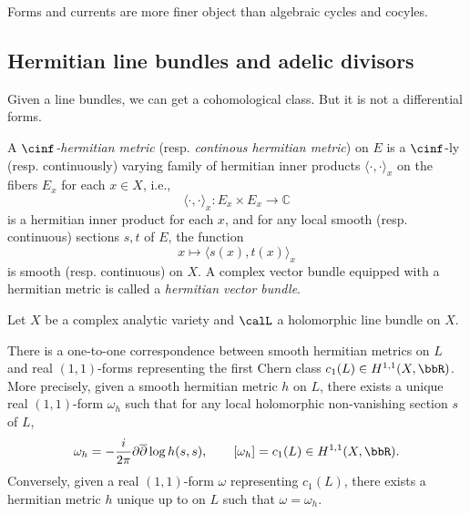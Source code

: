 Forms and currents are more finer object than algebraic cycles and cocyles.

\Yang{}







\subsection[status=draft,tag=0000000,label=\labelNFM{subsec:review-of-metrics}]{Hermitian line bundles and adelic divisors}


Given a line bundles, we can get a cohomological class.
But it is not a differential forms.

\begin{definition}[label=\labelNFM{def:hermitian-line-bundles}, status=draft, tag=0000000]
	A \emph{$\cinf$-hermitian metric} (resp. \emph{continous hermitian metric}) on \(E\) is a $\cinf$-ly (resp. continuously) varying family of hermitian inner products \(\langle \cdot, \cdot \rangle_x\) on the fibers \(E_x\) for each \(x \in X\),
	i.e.,
	\[\langle \cdot, \cdot \rangle_x: E_x \times E_x \to \mathbb{C}\]
	is a hermitian inner product for each \(x\), and for any local smooth (resp. continuous) sections \(s,t\) of \(E\), the function
	\[x \mapsto \langle s(x), t(x) \rangle_x\]
	is smooth (resp. continuous) on \(X\).
	A complex vector bundle equipped with a hermitian metric is called a \emph{hermitian vector bundle}.
\end{definition}

Let \(X\) be a complex analytic variety and $\calL$ a holomorphic line bundle on $X$.

\begin{proposition}\label{prop:correspondence_between_hermitian_metric_and_forms}
	There is a one-to-one correspondence between smooth hermitian metrics on \(L\) and real \((1,1)\)-forms representing the first Chern class \(c_1(L) \in H^{1,1}(X, \bbR)\).
	More precisely, given a smooth hermitian metric \(h\) on \(L\), there exists a unique real \((1,1)\)-form \(\omega_h\) such that for any local holomorphic non-vanishing section \(s\) of \(L\),
	\[\omega_h = -\frac{i}{2\pi} \partial \overline{\partial} \log h(s,s), \qquad [\omega_h] = c_1(L) \in H^{1,1}(X,\bbR).\]
	Conversely, given a real \((1,1)\)-form \(\omega\) representing \(c_1(L)\), there exists a hermitian metric \(h\) unique up to \Yang{} on \(L\) such that \(\omega = \omega_h\).
\end{proposition}


